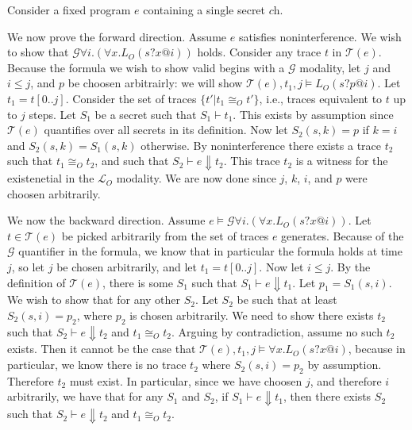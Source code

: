 \documentclass[conference]{IEEEtran}
\theoremstyle{definition}
\newcommand{\sch}{\textit{ch}}
\newcommand{\prin}{\textit{O}}
\newcommand{\traces}[1]{\mathcal{T}(#1)}
\newcommand{\tr}{t\xspace}
\newcommand{\talways}{\mathcal{G}}
\newcommand{\tpossible}[1]{\mathcal{L}_{#1}}
\begin{document}
\begin{Proof}
  Consider a fixed program $e$ containing a single secret $\sch$.

  We now prove the forward direction.  Assume $e$ satisfies
  noninterference. We wish to show that $\talways \forall i. ( \forall
  x. L_O(s ? x @ i) ) $ holds.  Consider any trace $\tr$ in
  $\traces{e}$. Because the formula we wish to show valid begins with
  a $\talways$ modality, let $j$ and $i \leq j$, and $p$ be choosen
  arbitrairly: we will show $\traces{e}, \tr_1 , j \models L_O(s ?  p
  @ i)$.  Let $\tr_1 = \tr[0..j]$.  Consider the set of traces $\{
  \tr' | \tr_1 \cong_{\prin} \tr' \}$, i.e., traces equivalent to
  $\tr$ up to $j$ steps.  Let $S_1$ be a secret such that $S_1
  \vdash \tr_1$.  This exists by assumption since $\traces{e}$
  quantifies over all secrets in its definition.  Now let
  $S_2(s,k) = p$ if $k = i$ and $S_2(s,k) = S_1(s,k)$ otherwise.  By
  noninterference there exists a trace $\tr_2$ such that $\tr_1
  \cong_\prin \tr_2$, and such that $S_2 \vdash e \Downarrow \tr_2$.
  This trace $\tr_2$ is a witness for the existenetial in the
  $\tpossible{\prin}$ modality.  We are now done since $j$, $k$, $i$,
  and $p$ were choosen arbitrarily.

  We now the backward direction.  Assume $e \models \talways \forall
  i. ( \forall x. L_O(s ? x @ i) ) $.  Let $\tr \in \traces{e}$ be
  picked arbitrarily from the set of traces $e$ generates.  Because of
  the $\talways$ quantifier in the formula, we know that in particular
  the formula holds at time $j$, so let $j$ be chosen arbitrarily, and
  let $\tr_1 = \tr[0..j]$.  Now let $i \leq j$.  By the definition of
  $\traces{e}$, there is some $S_1$ such that $S_1 \vdash e \Downarrow
  \tr_1$.  Let $p_1 = S_1(s,i)$.  We wish to show that for any other
  $S_2$.  Let $S_2$ be such that at least $S_2(s,i) = p_2$, where
  $p_2$ is chosen arbitrarily. We need to show there exists $\tr_2$
  such that $S_2 \vdash e \Downarrow \tr_2$ and $\tr_1 \cong_{\prin}
  \tr_2$.  Arguing by contradiction, assume no such $\tr_2$ exists.
  Then it cannot be the case that $\traces{e},\tr_1,j \models \forall
  x. L_O(s ? x @ i)$, because in particular, we know there is no trace
  $\tr_2$ where $S_2(s,i) = p_2$ by assumption.  Therefore $\tr_2$
  must exist.  In particular, since we have choosen $j$, and therefore
  $i$ arbitrarily, we have that for any $S_1$ and $S_2$, if $S_1
  \vdash e \Downarrow \tr_1$, then there exists $S_2$ such that $S_2
  \vdash e \Downarrow \tr_2$ and $\tr_1 \cong_{\prin} \tr_2$.
\end{Proof}
\end{document}
